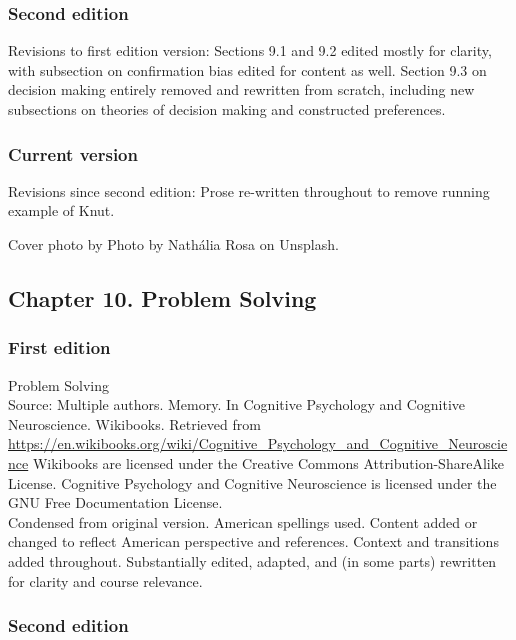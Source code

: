\documentclass[
]{krantz}
\begin{document}
\subsubsection*{Second edition}\label{second-edition-8}


Revisions to first edition version: Sections 9.1 and 9.2 edited mostly for clarity, with subsection on confirmation bias edited for content as well. Section 9.3 on decision making entirely removed and rewritten from scratch, including new subsections on theories of decision making and constructed preferences.

\subsubsection{Current version}\label{current-version-3}

Revisions since second edition: Prose re-written throughout to remove running example of Knut.

Cover photo by Photo by Nathália Rosa on Unsplash.

\subsection*{Chapter 10. Problem Solving}\label{chapter-10.-problem-solving}


\subsubsection*{First edition}\label{first-edition-10}


Problem Solving\\
Source: Multiple authors. Memory. In Cognitive Psychology and Cognitive Neuroscience. Wikibooks. Retrieved from \url{https://en.wikibooks.org/wiki/Cognitive_Psychology_and_Cognitive_Neuroscience}
Wikibooks are licensed under the Creative Commons Attribution-ShareAlike License.
Cognitive Psychology and Cognitive Neuroscience is licensed under the GNU Free Documentation License.\\
Condensed from original version. American spellings used. Content added or changed to reflect American perspective and references. Context and transitions added throughout. Substantially edited, adapted, and (in some parts) rewritten for clarity and course relevance.

\subsubsection*{Second edition}\label{second-edition-9}
\end{document}
